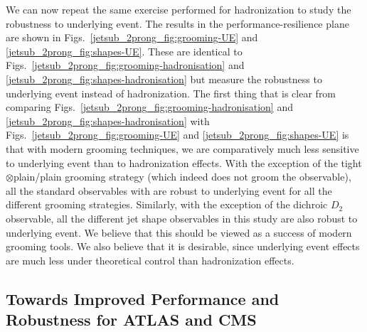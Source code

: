 \documentclass[11pt]{cernrep}
\begin{document}
We can now repeat the same exercise performed for hadronization to study the robustness to underlying event.
%
The results in the performance-resilience plane are shown in Figs.~\ref{jetsub_2prong_fig:grooming-UE} and \ref{jetsub_2prong_fig:shapes-UE}.
%
These are identical to Figs.~\ref{jetsub_2prong_fig:grooming-hadronisation} and \ref{jetsub_2prong_fig:shapes-hadronisation} but measure the robustness to underlying event instead of hadronization.
%
The first thing that is clear from comparing Figs.~\ref{jetsub_2prong_fig:grooming-hadronisation} and \ref{jetsub_2prong_fig:shapes-hadronisation} with  Figs.~\ref{jetsub_2prong_fig:grooming-UE} and \ref{jetsub_2prong_fig:shapes-UE} is that with modern grooming techniques, we are comparatively much less sensitive to underlying event than to hadronization effects.
%
With the exception of the tight$\otimes$plain/plain grooming strategy (which indeed does not groom the observable), all the standard observables with are robust to underlying event for all the different grooming strategies.
%
Similarly, with the exception of the dichroic $D_2$ observable, all the different jet shape observables in this study are also robust to underlying event.
%
We believe that this should be viewed as a success of modern grooming tools.
%
We also believe that it is desirable, since underlying event effects are much less under theoretical control than hadronization effects. 




\subsection{Towards Improved Performance and Robustness for ATLAS and CMS}\label{jetsub_2prong_sec:exp_compare}
\end{document}
